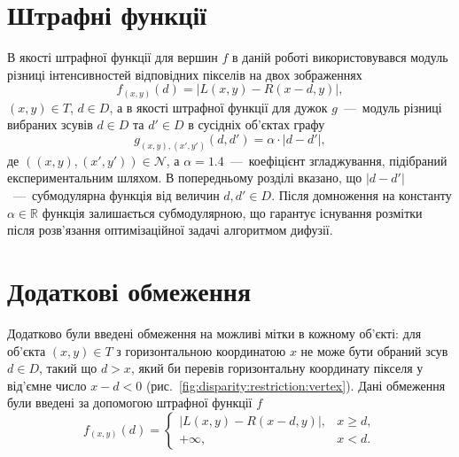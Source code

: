 \section{Штрафні функції}

В якості штрафної функції для вершин $f$
в даній роботі використовувався модуль різниці
інтенсивностей відповідних пікселів на двох зображеннях
\begin{equation*}
    f_{\left(x, y \right)} \left( d \right) =
    \left| L \left(x, y \right) - R \left(x - d, y \right) \right|,
\end{equation*}
$\left(x, y \right) \in T$, $d \in D$,
а в якості штрафної функції для дужок $g$~---~модуль різниці вибраних зсувів
$d \in D$ та $d' \in D$ в сусідніх об'єктах графу
\begin{equation*}
    g_{\left(x, y \right), \left(x', y' \right)} \left(d, d' \right) =
    \alpha \cdot \left| d - d' \right|,
\end{equation*}
де $\left(\left(x, y \right), \left(x', y' \right) \right) \in \mathcal{N}$,
а $\alpha = 1.4$~---~коефіцієнт згладжування,
підібраний експериментальним шляхом.
В попередньому розділі вказано, що
$\left| d - d' \right|$~---~субмодулярна функція від величин
$d, d' \in D$.
Після домноження на константу $\alpha \in \mathbb{R}$
функція залишається субмодулярною,
що гарантує існування розмітки після розв'язання оптимізаційної задачі
алгоритмом дифузії.

\section{Додаткові обмеження}

Додатково були введені обмеження на можливі мітки в кожному об'єкті:
для об'єкта $\left( x, y \right) \in T$ з горизонтальною координатою $x$
не може бути обраний зсув $d \in D$, такий що $d > x$,
який би перевів горизонтальну координату пікселя у від'ємне число
$x - d < 0$ (рис.~\ref{fig:disparity:restriction:vertex}).
Дані обмеження були введені за допомогою штрафної функції $f$
\begin{equation*}
    f_{\left(x, y \right)} \left( d \right) =
    \begin{cases}
        \left| L \left(x, y \right) - R \left(x - d, y \right) \right|,
            & x \ge d, \\
        + \infty, & x < d.
    \end{cases}
\end{equation*}

